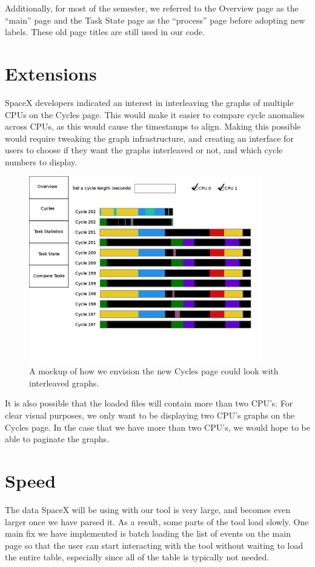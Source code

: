 \documentclass{hmcclinic}
\begin{document}
  Additionally, for most of the semester, we referred to the Overview page as
  the ``main'' page and the Task State page as the ``process'' page before
  adopting new labels. These old page titles are still used in our code.

\section{Extensions}
  SpaceX developers indicated an interest in interleaving the graphs of multiple
  CPUs on the Cycles page.  This would make it easier to compare cycle
  anomalies across CPUs, as this would cause the timestamps to align. Making
  this possible would require tweaking the graph infrastructure, and creating an
  interface for users to choose if they want the graphs interleaved or not, and
  which cycle numbers to display.

  \begin{figure}[H]
\begin{center}
\includegraphics[width=4in]{futureCycles.png}
\caption{A mockup of how we envision the new Cycles page could look with
interleaved graphs.}
\end{center}
\end{figure}

It is also possible that the loaded files will contain more than two CPU's.
For clear visual purposes, we only want to be displaying two CPU's graphs
on the Cycles page. In the case that we have more than two CPU's, 
we would hope to be able to paginate the graphs. 

\section{Speed} %
The data SpaceX will be using with our tool is very large, and becomes even
larger once we have parsed it. As a result, some parts of the tool load slowly. One main fix we have
implemented is batch loading the list of events on the main page so that the
user can start interacting with the tool without waiting to load the entire
table, especially since all of the table is typically not needed.
\end{document}
